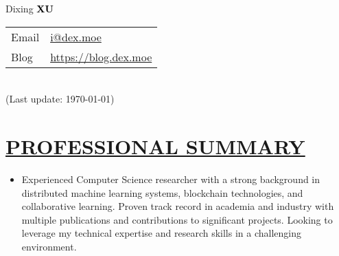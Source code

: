 \documentclass[11pt]{article}
\begin{document}
\begin{minipage}[t]{0.65\textwidth}
    {\Huge Dixing {\textbf{\textcolor{black}{XU}}}}
\end{minipage}
\begin{minipage}[t]{0.45\textwidth}
    {\small\raggedright
    \begin{tabular}{l@{: }l}
    Email & \href{mailto:i@dex.moe}{i@dex.moe} \\
    Blog & \href{https://blog.dex.moe}{https://blog.dex.moe} \\
    \end{tabular}\\
    (Last update: \today)
    }
\end{minipage}


%
%
\section*{\centering\underline{PROFESSIONAL SUMMARY}}
\begin{itemize}[noitemsep, nolistsep]
    \item[] Experienced Computer Science researcher with a strong background in distributed machine learning systems, blockchain technologies, and collaborative learning. Proven track record in academia and industry with multiple publications and contributions to significant projects. Looking to leverage my technical expertise and research skills in a challenging environment.
\end{itemize}
\vspace{20mm} %

\end{document}
